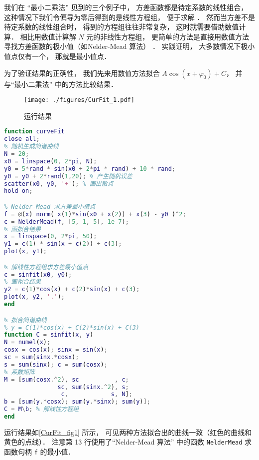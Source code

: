 
我们在 “最小二乘法” 见到的三个例子中， 方差函数都是待定系数的线性组合， 这种情况下我们令偏导为零后得到的是线性方程组， 便于求解%
． 然而当方差不是待定系数的线性组合时， 得到的方程组往往非常复杂， 这时就需要借助数值计算． 相比用数值计算解 $N$ 元的非线性方程组， 更简单的方法是直接用数值方法寻找方差函数的极小值（如Nelder-Mead 算法） ． 实践证明， 大多数情况下极小值点仅有一个， 那就是最小值点．

为了验证结果的正确性， 我们先来用数值方法拟合 $A\cos (x + \varphi_0) + C$， 并与“最小二乘法” 中的方法比较结果．

\begin{figure}[ht]
\centering
\texttt{[image: ./figures/CurFit\_1.pdf]}
\caption{运行结果} \label{CurFit_fig1}
\end{figure}

\begin{lstlisting}[language=matlab, caption=curveFit.m]
function curveFit
close all;
% 随机生成简谐曲线
N = 20;
x0 = linspace(0, 2*pi, N);
y0 = 5*rand * sin(x0 + 2*pi * rand) + 10 * rand;
y0 = y0 + 2*rand(1,20); % 产生随机误差
scatter(x0, y0, '+'); % 画出散点
hold on;

% Nelder-Mead 求方差最小值点
f = @(x) norm( x(1)*sin(x0 + x(2)) + x(3) - y0 )^2;
c = NelderMead(f, [5, 1, 5], 1e-7);
% 画拟合结果
x = linspace(0, 2*pi, 50);
y1 = c(1) * sin(x + c(2)) + c(3);
plot(x, y1);

% 解线性方程组求方差最小值点
c = sinfit(x0, y0);
% 画拟合结果
y2 = c(1)*cos(x) + c(2)*sin(x) + c(3);
plot(x, y2, '.');
end

% 拟合简谐曲线
% y = C(1)*cos(x) + C(2)*sin(x) + C(3)
function C = sinfit(x, y)
N = numel(x);
cosx = cos(x); sinx = sin(x);
sc = sum(sinx.*cosx);
s = sum(sinx); c = sum(cosx);
% 系数矩阵
M = [sum(cosx.^2), sc          , c;
               sc, sum(sinx.^2), s;
                c,            s, N];
b = [sum(y.*cosx); sum(y.*sinx); sum(y)];
C = M\b; % 解线性方程组
end
\end{lstlisting}

运行结果如\autoref{CurFit_fig1} 所示， 可见两种方法拟合出的曲线一致（红色的曲线和黄色的点线）． 注意第 13 行使用了“Nelder-Mead 算法” 中的函数 \verb|NelderMead| 求函数句柄 \verb|f| 的最小值．
